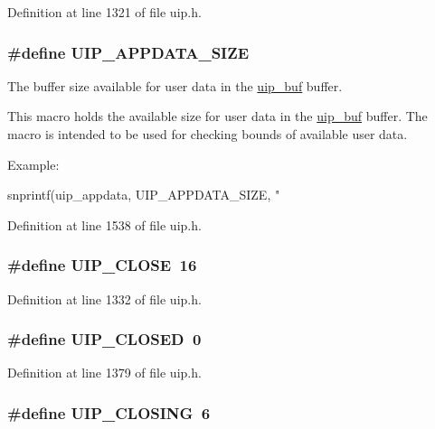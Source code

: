 Definition at line 1321 of file uip.h.

\hypertarget{group__uip_gae0825474feee11b4e038bfe71757875f}{
\subsubsection[{UIP\_\-APPDATA\_\-SIZE}]{\setlength{\rightskip}{0pt plus 5cm}\#define UIP\_\-APPDATA\_\-SIZE}}
\label{group__uip_gae0825474feee11b4e038bfe71757875f}
The buffer size available for user data in the \hyperlink{group__uipdevfunc_gab81e78f890dbbee50c533a9734b74fd9}{uip\_\-buf} buffer.

This macro holds the available size for user data in the \hyperlink{group__uipdevfunc_gab81e78f890dbbee50c533a9734b74fd9}{uip\_\-buf} buffer. The macro is intended to be used for checking bounds of available user data.

Example: 
\begin{DoxyCode}
 snprintf(uip_appdata, UIP_APPDATA_SIZE, "%
\end{DoxyCode}
 

Definition at line 1538 of file uip.h.

\hypertarget{group__uip_ga57e6dc1d58a36d0ed53a3dd29ccc5798}{
\subsubsection[{UIP\_\-CLOSE}]{\setlength{\rightskip}{0pt plus 5cm}\#define UIP\_\-CLOSE~16}}
\label{group__uip_ga57e6dc1d58a36d0ed53a3dd29ccc5798}


Definition at line 1332 of file uip.h.

\hypertarget{group__uip_ga28eda870cff3d8e3cf2949e6f57a502b}{
\subsubsection[{UIP\_\-CLOSED}]{\setlength{\rightskip}{0pt plus 5cm}\#define UIP\_\-CLOSED~0}}
\label{group__uip_ga28eda870cff3d8e3cf2949e6f57a502b}


Definition at line 1379 of file uip.h.

\hypertarget{group__uip_ga64d9affc680a445d708234e70450477b}{
\subsubsection[{UIP\_\-CLOSING}]{\setlength{\rightskip}{0pt plus 5cm}\#define UIP\_\-CLOSING~6}}
\label{group__uip_ga64d9affc680a445d708234e70450477b}


